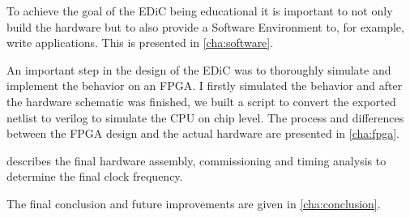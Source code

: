 To achieve the goal of the \gls{EDiC} being educational it is important to not only build the hardware but to also provide a Software Environment to, for example, write applications.
This is presented in \cref{cha:software}.

An important step in the design of the \gls{EDiC} was to thoroughly simulate and implement the behavior on an \gls{FPGA}.
I firstly simulated the behavior and after the hardware schematic was finished, we built a script to convert the exported netlist to verilog to simulate the \gls{CPU} on chip level.
The process and differences between the \gls{FPGA} design and the actual hardware are presented in \cref{cha:fpga}.

 describes the final hardware assembly, commissioning and timing analysis to determine the final clock frequency.

The final conclusion and future improvements are given in \cref{cha:conclusion}.
